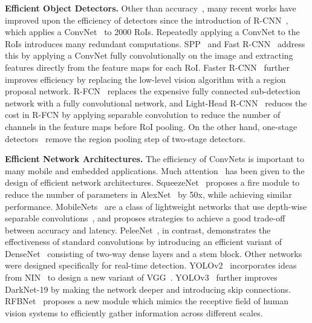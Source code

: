 \documentclass{bmvc2k}
\begin{document}
\smallskip \noindent \textbf{Efficient Object Detectors.} Other than accuracy~\cite{cai2016unified,shrivastava2016beyond,huang2017speed,lin2017feature,dai2017deformable,zhu2018deformable,he2017mask,peng2018megdet,singh2018analysis,zhai2018feature,xu2018deep,cheng2018revisiting,jiang2018acquisition}, many recent works have improved upon the efficiency of detectors since the introduction of R-CNN~\cite{girshick2014rich}, which applies a ConvNet~\cite{krizhevsky2012imagenet} to 2000 RoIs. Repeatedly applying a ConvNet to the RoIs introduces many redundant computations. SPP~\cite{he2015spatial} and Fast R-CNN~\cite{girshick2015fast} address this by applying a ConvNet fully convolutionally on the image and extracting features directly from the feature maps for each RoI. Faster R-CNN~\cite{ren2015faster} further improves efficiency by replacing the low-level vision algorithm with a region proposal network. R-FCN~\cite{dai2016r} replaces the expensive fully connected sub-detection network with a fully convolutional network, and Light-Head R-CNN~\cite{li2017light} reduces the cost in R-FCN by applying separable convolution to reduce the number of channels in the feature maps before RoI pooling. On the other hand, one-stage detectors~\cite{liu2016ssd,redmon2016you,fu2017dssd,redmon2017yolo9000,lin2017focal,wang2017point,kong2017ron,jeong2017enhancement,zhang2018single,zhao2018m2det,shen2017dsod,zhang2018singleencried} remove the region pooling step of two-stage detectors.

\smallskip \noindent \textbf{Efficient Network Architectures.} The efficiency of ConvNets is important to many mobile and embedded applications. Much attention~\cite{li2016pruning,rastegari2016xnor,zhang2018shufflenet,ma2018shufflenet,laube2018shufflenasnets,hu2018squeeze,sandler2018mobilenetv2} has been given to the design of efficient network architectures. SqueezeNet~\cite{iandola2016squeezenet} proposes a fire module to reduce the number of parameters in AlexNet~\cite{krizhevsky2012imagenet} by 50x, while achieving similar performance.  MobileNets~\cite{howard2017mobilenets} are a class of lightweight networks that use depth-wise separable convolutions~\cite{chollet2017xception}, and proposes strategies to achieve a good trade-off between accuracy and latency. PeleeNet~\cite{wang2018pelee}, in contrast, demonstrates the effectiveness of standard convolutions by introducing an efficient variant of DenseNet~\cite{huang2017densely} consisting of two-way dense layers and a stem block. Other networks were designed specifically for real-time detection. YOLOv2~\cite{redmon2017yolo9000} incorporates ideas from NIN~\cite{lin2013network} to design a new variant of VGG~\cite{simonyan2014very}. YOLOv3~\cite{redmon2018yolov3} further improves DarkNet-19 by making the network deeper and introducing skip connections. RFBNet~\cite{liu2018receptive} proposes a new module which mimics the receptive field of human vision systems to efficiently gather information across different scales.
\end{document}
